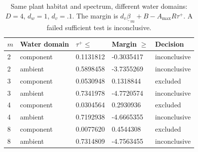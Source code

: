 \begin{table}[htbp]
\centering
\caption{Same plant habitat and spectrum, different water domains: $D=4$, $d_w=1$, $d_v=.1$. The margin is $d_v\underline\beta_m+B-A_{\max}R\tau^+$. A failed sufficient test is inconclusive.}
\label{tab:water_domains}
\begin{tabular}{lllll}
\toprule
$m$ & Water domain & $\tau^+\leq$ & Margin $\geq$ & Decision \\
\midrule
2 & component & 0.1131812 & -0.3035417 & inconclusive \\
2 & ambient & 0.5898458 & -3.7355269 & inconclusive \\
3 & component & 0.0530948 & 0.1318844 & excluded \\
3 & ambient & 0.7341978 & -4.7720574 & inconclusive \\
4 & component & 0.0304564 & 0.2930936 & excluded \\
4 & ambient & 0.7192938 & -4.6665355 & inconclusive \\
8 & component & 0.0077620 & 0.4544308 & excluded \\
8 & ambient & 0.7314809 & -4.7563455 & inconclusive \\
\bottomrule
\end{tabular}
\end{table}
